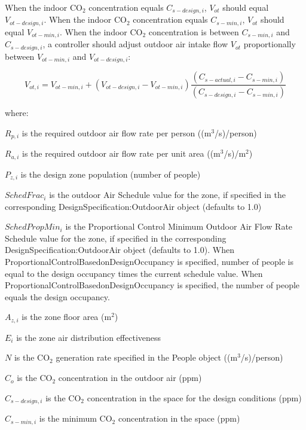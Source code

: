 When the indoor CO\(_{2}\) concentration equals \({C_{s - design,i}}\), \({V_{ot}}\) should equal \({V_{ot - design,i}}\). When the indoor CO\(_{2}\) concentration equals \({C_{s - min,i}}\), \({V_{ot}}\) should equal \({V_{ot - min,i}}\). When the indoor CO\(_{2}\) concentration is between \({C_{s - min,i}}\) and \({C_{s - design,i}}\), a controller should adjust outdoor air intake flow \({V_{ot}}\) proportionally between \({V_{ot - min,i}}\) and \({V_{ot - design,i}}\):

\begin{equation}
{V_{ot,i}} = {V_{ot - min,i}} + ({V_{ot - design,i}} - {V_{ot - min,i}})\frac{{({C_{s - actual,i}} - {C_{s - min,i}})}}{{({C_{s - design,i}} - {C_{s - min,i}})}}
\end{equation}

where:

\({R_{p,i}}\) is the required outdoor air flow rate per person ((m\(^{3}\)/s)/person)

\({R_{a,i}}\) is the required outdoor air flow rate per unit area ((m\(^{3}\)/s)/m\(^{2}\))

\({P_{z,i}}\) is the design zone population (number of people)

\({SchedFrac_i}\) is the outdoor Air Schedule value for the zone, if specified in the corresponding DesignSpecification:OutdoorAir object (defaults to 1.0)

\({SchedPropMin_i}\) is the Proportional Control Minimum Outdoor Air Flow Rate Schedule value for the zone, if specified in the corresponding DesignSpecification:OutdoorAir object (defaults to 1.0).  When ProportionalControlBasedonDesignOccupancy is specified, number of people is equal to the design occupancy times the current schedule value.  When ProportionalControlBasedonDesignOccupancy is specified, the number of people equals the design occupancy.

\({A_{z,i}}\) is the zone floor area (m\(^{2}\))

\({E_i}\) is the zone air distribution effectiveness

\(N\) is the CO\(_{2}\) generation rate specified in the People object ((m\(^{3}\)/s)/person)

\({C_o}\) is the CO\(_{2}\) concentration in the outdoor air (ppm)

\({C_{s - design,i}}\) is the CO\(_{2}\) concentration in the space for the design conditions (ppm)

\({C_{s - min,i}}\) is the minimum CO\(_{2}\) concentration in the space (ppm)

